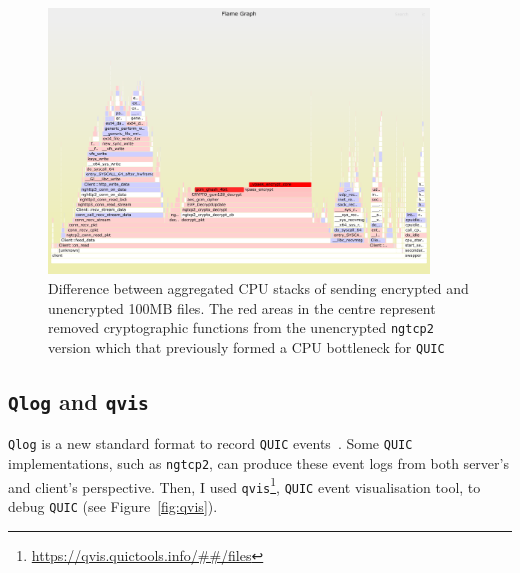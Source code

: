 \documentclass[12pt,a4paper]{report}
\newcommand\note[2]{{\color{#1}\bf #2}}
\newcommand\simon[1]{\ifcomments{\note{cyan}{SM: #1}}\fi}
\begin{document}
    \begin{figure}[H]
    \centering
    \includegraphics[width=0.9\textwidth]{figs/perf-kernel__johns_BIG_letter__encrypted_minus_perf-kernel__johns_BIG_letter__unencrypted.png}
    \caption[Difference between aggregated CPU stacks of sending encrypted and unencrypted 100MB files]{Difference between aggregated CPU stacks of sending encrypted and unencrypted 100MB files. The red areas in the centre represent removed cryptographic functions from the unencrypted \texttt{ngtcp2} version which that previously formed a CPU bottleneck for \texttt{QUIC}}
    \label{fig:perf-kernel__johns_BIG_letter__encrypted_minus_perf-kernel__johns_BIG_letter__unencrypted}
    \end{figure}






    
\subsection{\texttt{Qlog} and \texttt{qvis}}

\texttt{Qlog} is a new standard format to record \texttt{QUIC} events~\cite{draft-marx-qlog-event-definitions-quic-h3}.
Some \texttt{QUIC} implementations, such as \texttt{ngtcp2}, can produce these event logs from both server's and client's perspective.
Then, I used \texttt{qvis}\footnote{\url{https://qvis.quictools.info/##/files}}, \texttt{QUIC} event visualisation tool, to debug \texttt{QUIC} (see Figure~\ref{fig:qvis}).
\end{document}
